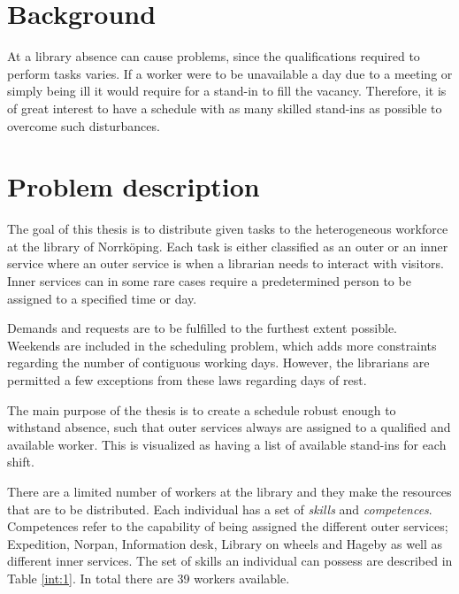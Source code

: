 

\section{Background}
At a library absence can cause problems, since the qualifications required to perform tasks varies. If a worker were to be unavailable a day due to a meeting or simply being ill it would require for a stand-in to fill the vacancy. Therefore, it is of great interest to have a schedule with as many skilled stand-ins as possible to overcome such disturbances. 


\section{Problem description}
The goal of this thesis is to distribute given tasks to the heterogeneous workforce at the library of Norrköping. Each task is either classified as an outer or an inner service where an outer service is when a librarian needs to interact with visitors. Inner services can in some rare cases require a predetermined person to be assigned to a specified time or day.

Demands and requests are to be fulfilled to the furthest extent possible. Weekends are included in the scheduling problem, which adds more constraints regarding the number of contiguous working days. However, the librarians are permitted a few exceptions from these laws regarding days of rest.

The main purpose of the thesis is to create a schedule robust enough to withstand absence, such that outer services always are assigned to a qualified and available worker. This is visualized as having a list of available stand-ins for each shift. 

There are a limited number of workers at the library and they make the resources that are to be distributed. Each individual has a set of \textit{skills} and \textit{competences}. Competences refer to the capability of being assigned the different outer services; Expedition, Norpan, Information desk, Library on wheels and Hageby as well as different inner services. The set of skills an individual can possess are described in Table \ref{int:1}. In total there are 39 workers available.

